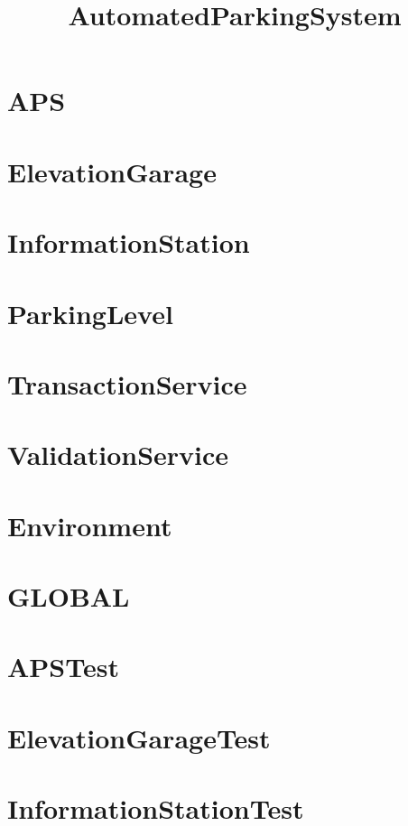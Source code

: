 \documentclass{article}
\begin{document}
\title{AutomatedParkingSystem}
\author{}
\maketitle
\tableofcontents

\section{APS}

\section{ElevationGarage}

\section{InformationStation}

\section{ParkingLevel}

\section{TransactionService}

\section{ValidationService}

\section{Environment}

\section{GLOBAL}

\section{APSTest}

\section{ElevationGarageTest}

\section{InformationStationTest}

\end{document}
